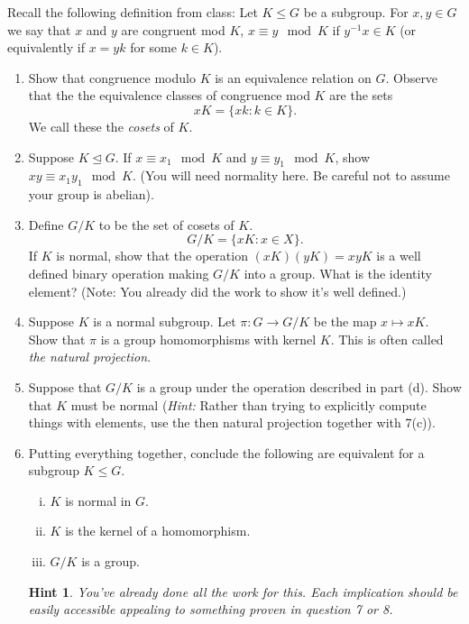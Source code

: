 \documentclass[11pt]{article}
\newtheorem*{hint}{Hint}
\begin{document}
\begin{enumerate}
  Recall the following definition from class: Let $K\le G$ be a subgroup.  For $x,y\in G$  we say that $x$ and $y$ are congruent mod $K$, $x\equiv y\mod K$ if $y^{-1}x\in K$ (or equivalently if $x=yk$ for some $k\in K$).
  \begin{enumerate}
    \item Show that congruence modulo $K$ is an equivalence relation on $G$.  Observe that the the equivalence classes of congruence mod $K$ are the sets
    \[xK = \{xk:k\in K\}.\]
    We call these the \textit{cosets} of $K$.
    \item Suppose $K\unlhd G$.  If $x\equiv x_1\mod K$ and $y\equiv y_1\mod K$, show $xy\equiv x_1y_1\mod K$.  (You will need normality here.  Be careful not to assume your group is abelian).
    \item Define $G/K$ to be the set of cosets of $K$.
     \[G/K = \{xK:x\in X\}.\]
     If $K$ is normal, show that the operation $(xK)(yK) = xyK$ is a well defined binary operation making $G/K$ into a group.  What is the identity element?  (Note: You already did the work to show it's well defined.)
    \item Suppose $K$ is a normal subgroup.  Let $\pi:G\to G/K$ be the map $x\mapsto xK$.  Show that $\pi$ is a group homomorphisms with kernel $K$.  This is often called \textit{the natural projection}.
    \item Suppose that $G/K$ is a group under the operation described in part (d).  Show that $K$ must be normal (\textit{Hint:} Rather than trying to explicitly compute things with elements, use the then natural projection together with 7(c)).
    \item Putting everything together, conclude the following are equivalent for a subgroup $K\le G$.
    \begin{enumerate}[(i)]
      \item $K$ is normal in $G$.
      \item $K$ is the kernel of a homomorphism.
      \item $G/K$ is a group.
    \end{enumerate}
    \begin{hint}
      You've already done all the work for this.  Each implication should be easily accessible appealing to something proven in question 7 or 8.
    \end{hint}
  \end{enumerate}

\end{enumerate}
\end{document}
